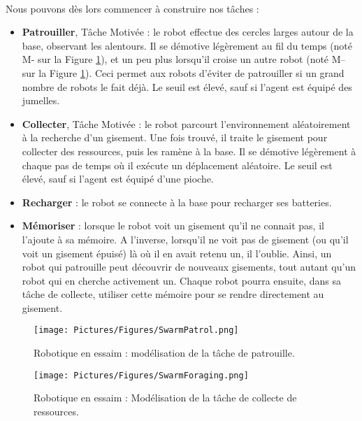 		\paragraph{}
		Nous pouvons dès lors commencer à construire nos tâches :
		\begin{itemize}
			\item \textbf{Patrouiller}, Tâche Motivée : le robot effectue des cercles larges autour de la base, observant les alentours. Il se démotive légèrement au fil du temps (noté M- sur la Figure \ref{swarmPatrol}), et un peu plus lorsqu'il croise un autre robot (noté M-- sur la Figure \ref{swarmPatrol}). Ceci permet aux robots d'éviter de patrouiller si un grand nombre de robots le fait déjà. Le seuil est élevé, sauf si l'agent est équipé des jumelles.
			\item \textbf{Collecter}, Tâche Motivée : le robot parcourt l'environnement aléatoirement à la recherche d'un gisement. Une fois trouvé, il traite le gisement pour collecter des ressources, puis les ramène à la base. Il se démotive légèrement à chaque pas de temps où il exécute un déplacement aléatoire. Le seuil est élevé, sauf si l'agent est équipé d'une pioche.
			\item \textbf{Recharger} : le robot se connecte à la base pour recharger ses batteries.
			\item \textbf{Mémoriser} : lorsque le robot voit un gisement qu'il ne connait pas, il l'ajoute à sa mémoire. A l'inverse, lorsqu'il ne voit pas de gisement (ou qu'il voit un gisement épuisé) là où il en avait retenu un, il l'oublie. Ainsi, un robot qui patrouille peut découvrir de nouveaux gisements, tout autant qu'un robot qui en cherche activement un. Chaque robot pourra ensuite, dans sa tâche de collecte, utiliser cette mémoire pour se rendre directement au gisement.
		\end{itemize}
	
	\begin{figure}
	\centering
	\texttt{[image: Pictures/Figures/SwarmPatrol.png]}
	\caption{Robotique en essaim : modélisation de la tâche de patrouille.}
	\label{swarmPatrol}
	\end{figure}
	
	\begin{figure}	
	\centering
	\texttt{[image: Pictures/Figures/SwarmForaging.png]}
	\caption{Robotique en essaim : Modélisation de la tâche de collecte de ressources.}
	\label{swarmForaging}
	\end{figure}
		
